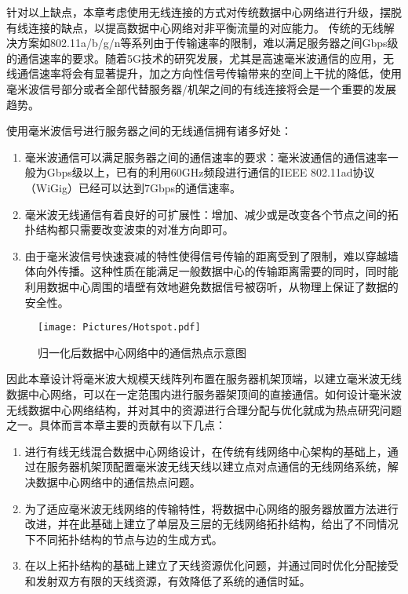 针对以上缺点，本章考虑使用无线连接的方式对传统数据中心网络进行升级，摆脱有线连接的缺点，以提高数据中心网络对非平衡流量的对应能力。
传统的无线解决方案如802.11a/b/g/n等系列由于传输速率的限制，难以满足服务器之间Gbps级的通信速率的要求。随着5G技术的研究发展，尤其是高速毫米波通信的应用，无线通信速率将会有显著提升，加之方向性信号传输带来的空间上干扰的降低，使用毫米波信号部分或者全部代替服务器/机架之间的有线连接将会是一个重要的发展趋势\cite{zhang2017free}。

使用毫米波信号进行服务器之间的无线通信拥有诸多好处：
\begin{enumerate}
\item 毫米波通信可以满足服务器之间的通信速率的要求：毫米波通信的通信速率一般为Gbps级以上，已有的利用60GHz频段进行通信的IEEE 802.11ad协议\cite{80211ad}（WiGig）已经可以达到7Gbps的通信速率。
\item 毫米波无线通信有着良好的可扩展性：增加、减少或是改变各个节点之间的拓扑结构都只需要改变波束的对准方向即可。
\item 由于毫米波信号快速衰减的特性使得信号传输的距离受到了限制，难以穿越墙体向外传播。这种性质在能满足一般数据中心的传输距离需要的同时，同时能利用数据中心周围的墙壁有效地避免数据信号被窃听，从物理上保证了数据的安全性。
\end{enumerate}

\begin{figure}[htbp]
\centering
\texttt{[image: Pictures/Hotspot.pdf]}
\caption{归一化后数据中心网络中的通信热点示意图\cite{kandula2009flyways}}
\label{fig:hs}
\end{figure}

因此本章设计将毫米波大规模天线阵列布置在服务器机架顶端，以建立毫米波无线数据中心网络，可以在一定范围内进行服务器架顶间的直接通信。如何设计毫米波无线数据中心网络结构，并对其中的资源进行合理分配与优化就成为热点研究问题之一。具体而言本章主要的贡献有以下几点：
\begin{enumerate}
\item 进行有线无线混合数据中心网络设计，在传统有线网络中心架构的基础上，通过在服务器机架顶配置毫米波无线天线以建立点对点通信的无线网络系统，解决数据中心网络中的通信热点问题。

\item 为了适应毫米波无线网络的传输特性，将数据中心网络的服务器放置方法进行改进，并在此基础上建立了单层及三层的无线网络拓扑结构，给出了不同情况下不同拓扑结构的节点与边的生成方式。

\item 在以上拓扑结构的基础上建立了天线资源优化问题，并通过同时优化分配接受和发射双方有限的天线资源，有效降低了系统的通信时延。
\end{enumerate}

